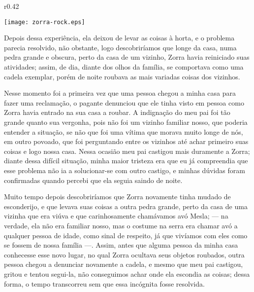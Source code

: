 \begin{wrapfigure}{r}{0.42\textwidth}
  \begin{center}
  \vspace{-10pt}
    \texttt{[image: zorra-rock.eps]}
  \end{center}
  \vspace{-20pt}
\end{wrapfigure}
Depois dessa experiência, ela deixou de  levar as coisas à horta, e o problema parecia resolvido, não obstante, logo descobriríamos que longe da casa, numa pedra grande e obscura, perto da casa de um vizinho, Zorra havia reiniciado suas atividades; assim, de dia, diante dos olhos da família, se comportava como uma cadela exemplar, porém de noite roubava as mais variadas coisas dos vizinhos.

Nesse momento foi a primeira vez que uma pessoa chegou a minha casa para fazer uma reclamação, o pagante denunciou que ele tinha visto em pessoa como Zorra havia entrado na sua casa a roubar. 
A indignação do meu pai foi tão grande quanto sua vergonha, pois não foi um vizinho familiar nosso, que poderia entender a situação, se não que foi uma vítima que morava muito longe de nós, em outro povoado, que foi perguntando entre os vizinhos até achar primeiro suas coisas e logo nossa casa.
Nessa ocasião meu pai castigou mais duramente a Zorra; diante dessa difícil situação, minha maior tristeza era que eu já compreendia que esse problema não ia a solucionar-se com outro castigo, e minhas dúvidas foram confirmadas quando percebi que ela seguia saindo de noite. 

Muito tempo depois descobriríamos que Zorra novamente tinha mudado de esconderijo, e que levava suas coisas a outra pedra grande, perto da casa de uma vizinha que era viúva e que carinhosamente chamávamos avó Mesla; --- na verdade, ela não era familiar nosso, mas o costume na serra era chamar avó a qualquer pessoa de idade, como sinal de respeito, já que vivíamos com eles como se fossem de nossa família ---.
Assim, antes que alguma pessoa da minha casa conhecesse esse novo lugar, no qual Zorra ocultava seus objetos roubados, outra pessoa chegou a denunciar novamente a cadela, e mesmo que meu pai castigou, gritou e tentou segui-la, não conseguimos achar onde ela escondia as coisas; dessa forma, o tempo transcorreu sem que essa incógnita fosse resolvida. 

